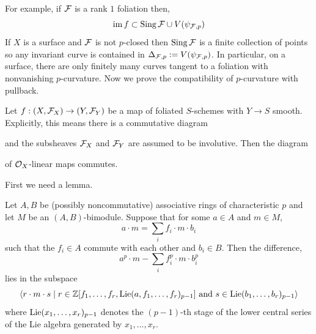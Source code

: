 \documentclass[main.tex]{subfiles}
\begin{document}
For example, if $\mathcal{F}$ is a rank $1$ foliation then,
\[ \operatorname{\mathrm{im}}{f} \subset \operatorname{\mathrm{Sing}}{\mathcal{F}} \cup V(\psi_{\mathcal{F},p}) \]
If $X$ is a surface and $\mathcal{F}$ is not $p$-closed then $\operatorname{\mathrm{Sing}}{\mathcal{F}}$ is a finite collection of points so any invariant curve is contained in $\Delta_{\mathcal{F},p} := V(\psi_{\mathcal{F},p})$. In particular, on a surface, there are only finitely many curves tangent to a foliation with nonvanishing $p$-curvature. Now we prove the compatibility of $p$-curvature with pullback.


\begin{prop} \label{prop:pullback_p_curvature}
Let $f : (X, \mathcal{F}_X) \to (Y, \mathcal{F}_Y)$ be a map of foliated $S$-schemes with $Y \to S$ smooth. Explicitly, this means there is a commutative diagram
\begin{center}
\end{center}
and the subsheaves $\mathcal{F}_X$ and $\mathcal{F}_Y$ are assumed to be involutive. Then the diagram
\begin{center}
\end{center}
of $\mathcal{O}_{X}$-linear maps commutes.
\end{prop}

First we need a lemma.


\begin{lemma}
Let $A,B$ be (possibly noncommutative) associative rings of characteristic $p$ and let $M$ be an $(A,B)$-bimodule. Suppose that for some $a \in A$ and $m \in M$,
\[ a \cdot m = \sum_i f_i \cdot m \cdot b_i \]
such that the $f_i \in A$ commute with each other and $b_i \in B$. Then the difference,
\[ a^p \cdot m - \sum_i f_i^p \cdot m \cdot b_i^p \]
lies in the subspace
\[  \left< r \cdot m \cdot s \mid r \in \mathbb{Z}[f_1, \dots, f_r, \mathrm{Lie}(a, f_1, \dots, f_r)_{p-1}] \text{ and } s \in \mathrm{Lie}(b_1, \dots, b_r)_{p-1} \right>  \]
where $\mathrm{Lie}(x_1, \dots, x_r)_{p-1}$ denotes the $(p-1)$-th stage of the lower central series of the Lie algebra generated by $x_1, \dots, x_r$. 
\end{lemma}
\end{document}

